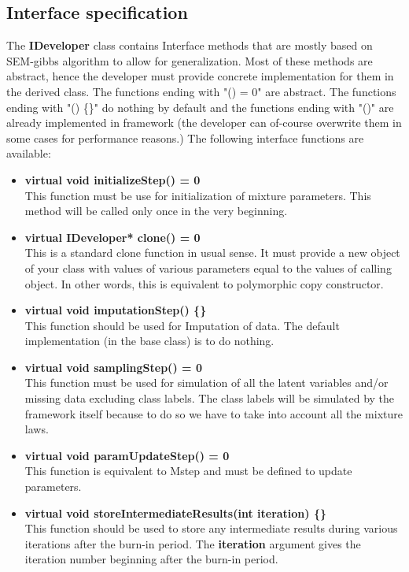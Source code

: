 \documentclass[a4paper,11pt]{article}
\begin{document}
\subsection{Interface specification}
The {\bf IDeveloper} class contains Interface methods that 
are mostly based on SEM-gibbs algorithm to allow for generalization. Most of these methods are abstract, hence the developer must provide
concrete implementation for them in the derived class. The functions ending with "() = 0" are abstract. The functions ending with "() \{\}" do nothing by default and the functions
ending with "()" are already implemented in framework (the developer can of-course
overwrite them in some cases for performance reasons.) The following interface functions are available:
\begin{itemize}
\item {\bf virtual void initializeStep() = 0} \\
This function must be use for initialization of mixture parameters.
This method will be called only once in the very beginning.
\item {\bf virtual IDeveloper* clone() = 0} \\
This is a standard clone function in usual sense. It must provide a new object of your class with values of various parameters equal to the values of calling
object. In other words, this is equivalent to polymorphic copy constructor. 
\item {\bf virtual void imputationStep() \{\}}\\
This function should be used for Imputation of data. The default implementation (in the base class) is to do nothing.
\item {\bf virtual void samplingStep() = 0} \\
This function must be used for simulation of all the latent variables and/or missing data
excluding class labels. The class labels will be simulated by the framework itself because to do so
we have to take into account all the mixture laws. 
\item {\bf virtual void paramUpdateStep() = 0}\\
This function is equivalent to Mstep and must be defined to update parameters.
\item {\bf virtual void storeIntermediateResults(int iteration) \{\}}\\
This function should be used to store any intermediate results during various iterations after the burn-in period. The {\bf iteration} argument gives the 
iteration number beginning after the burn-in period.

\end{itemize}
\end{document}

